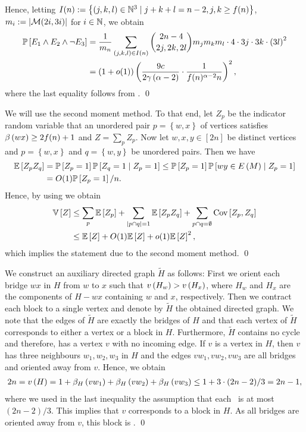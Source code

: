 Hence, letting $I(n):=\left\{\left(j,k,l\right) \in \mathbb{N}^3 \mid j+k+l=n-2, j,k\geq f(n)\right\}$, $m_i:=\left|\mathcal{M}(2i,3i)\right|$ for $i \in \mathbb{N}$, we obtain 
\begin{align*}
\mathbb{P}\left[E_1 \wedge E_2 \wedge \neg E_3\right]
&= \frac{1}{m_n}\sum_{(j,k,l)\in I(n)}\binom{2n-4}{2j,2k,2l}m_jm_km_l\cdot 4 \cdot 3j \cdot 3k \cdot \left(3l\right)^2\\
&= (1+o(1))\left(\frac{9c}{2\gamma\left(\alpha-2\right)}\cdot \frac{1}{f(n)^{\alpha-2}n}\right)^2,
\end{align*}
where the last equality follows from .
\qed

We will use the second moment method. To that end, let $Z_p$ be the indicator random variable that an unordered pair $p=\left\{w,x\right\}$ of vertices satisfies $\beta\left(wx\right)\geq 2f(n)+1$ and $Z=\sum_{p}Z_p$. Now let $w, x, y \in [2n]$ be distinct vertices and $p=\left\{w,x\right\}$ and $q=\left\{w,y\right\}$ be unordered pairs. Then we have
\begin{align*}
\mathbb{E}\left[Z_pZ_q\right]&=\mathbb{P}\left[Z_p=1\right]\mathbb{P}\left[Z_q=1 \;\middle|\; Z_p=1\right]\leq \mathbb{P}\left[Z_p=1\right]\mathbb{P}\left[wy\in E\left(M\right) \;\middle|\; Z_p=1\right]
\\
&=O(1)\mathbb{P}\left[Z_p=1\right]/n.
\end{align*}
Hence, by using  we obtain
\begin{align*}
\mathbb{V}\left[Z\right]&\leq \sum_{p}\mathbb{E}\left[Z_p\right]+\sum_{\left|p \cap q\right|=1}\mathbb{E}\left[Z_pZ_q\right]+\sum_{p \cap q=\emptyset}\operatorname{Cov}\left[Z_p, Z_q\right]
\\
&\leq \mathbb{E}\left[Z\right]+O(1)\mathbb{E}\left[Z\right]+o(1)\mathbb{E}\left[Z\right]^2,
\end{align*}
which implies the statement due to the second moment method.
\qed


We construct an auxiliary directed graph $\widetilde{H}$ as follows: First we orient each bridge $wx$ in $H$ from $w$ to $x$ such that $v\left({H_w}\right)>v\left({H_x}\right)$, where $H_w$ and $H_x$ are the components of $H-wx$ containing $w$ and $x$, respectively. Then we contract each block to a single vertex and denote by $\widetilde{H}$ the obtained directed graph. We note that the edges of $\widetilde{H}$ are exactly the bridges of $H$ and that each vertex of $\widetilde{H}$ corresponds to either a vertex or a block in $H$. Furthermore, $\widetilde{H}$ contains no cycle and therefore, has a vertex $v$ with no incoming edge. If $v$ is a vertex in $H$, then $v$ has three neighbours $w_1, w_2, w_3$ in $H$ and the edges $vw_1, vw_2, vw_3$ are all bridges and oriented away from $v$. Hence, we obtain 
\begin{align*}
2n=v\left({H}\right)=1+\beta_{H}\left(vw_1\right)+\beta_{H}\left(vw_2\right)+\beta_{H}\left(vw_3\right)\leq 1+3\cdot (2n-2)/3=2n-1,
\end{align*}
where we used in the last inequality the assumption that each \bridgeNumber\ is at most $(2n-2)/3$. This implies that $v$ corresponds to a block in $H$. As all bridges are oriented away from $v$, this block is \largeBlock. \qed

